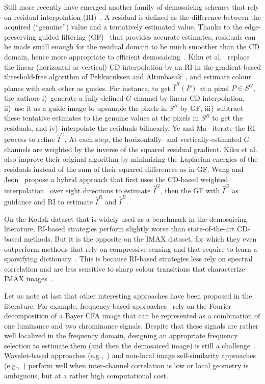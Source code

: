 \documentclass[twoside]{article}
\begin{document}
Still more recently have emerged another family of demosaicing schemes that rely on residual interpolation (RI)~\cite{kiku_icip_2013}. A residual is defined as the difference between the acquired (``genuine'') value and a tentatively estimated value. Thanks to the edge-preserving guided filtering (GF)~\cite{he_pami_2013} that provides accurate estimates, residuals can be made small enough for the residual domain to be much smoother than the CD domain, hence more appropriate to efficient demosaicing~\cite{ye_ip_2015}. Kiku et al.~\cite{kiku_icip_2013} replace the linear (horizontal or vertical) CD interpolation by an RI in the gradient-based threshold-free algorithm of Pekkucuksen and Altunbasak~\cite{pekkucuksen_ip_2013}, and estimate colour planes with each other as guides. For instance, to get $\hat{I}^R(P)$ at a pixel $P \in S^G$, the authors i)~generate a fully-defined $G$ channel by linear CD interpolation, ii)~use it as a guide image to upsample the pixels in $S^R$ by GF, iii)~subtract these tentative estimates to the genuine values at the pixels in $S^R$ to get the residuals, and iv)~interpolate the residuals bilinearly. Ye and Ma~\cite{ye_ip_2015} iterate the RI process to refine $\hat{I}^G$. At each step, the horizontally- and vertically-estimated $G$ channels are weighted by the inverse of the squared residual gradient. Kiku et al.~\cite{kiku_spie_2014,kiku_ip_2016} also improve their original algorithm by minimizing the Laplacian energies of the residuals instead of the sum of their squared differences as in GF. Wang and Jeon~\cite{wang_spl_2015} propose a hybrid approach that first uses the CD-based weighted interpolation~\cite{chen_csvt_2015} over eight directions to estimate $\hat{I}^G$, then the GF with $\hat{I}^G$ as guidance and RI to estimate $\hat{I}^R$ and $\hat{I}^B$.

On the Kodak dataset that is widely used as a benchmark in the demosaicing literature, RI-based strategies perform slightly worse than state-of-the-art CD-based methods. But it is the opposite on the IMAX dataset, for which they even outperform methods that rely on compressive sensing and that require to learn a sparsifying dictionary~\cite{mairal_iccv_2009,moghadam_ip_2013,rossi_icip_2014}. This is because RI-based strategies less rely on spectral correlation and are less sensitive to sharp colour transitions that characterize IMAX images~\cite{duran_ip_2014}.

Let us note at last that other interesting approaches have been proposed in the literature. For example, frequency-based approaches~\cite{alleysson_spie_2008} rely on the Fourier decomposition of a Bayer CFA image that can be represented as a combination of one luminance and two chrominance signals. Despite that these signals are rather well localized in the frequency domain, designing an appropriate frequency selection to estimate them (and then the demosaiced image) is still a challenge~\cite{dubois_spl_2005,leung_ip_2011}. Wavelet-based approaches (e.g.,~\cite{liang_ipi_2013,korneliussen_ip_2014}) and non-local image self-similarity approaches (e.g.,~\cite{duran_ip_2014}) perform well when inter-channel correlation is low or local geometry is ambiguous, but at a rather high computational cost.
\end{document}
